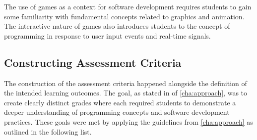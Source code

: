 






The use of games as a context for software development requires students to gain some familiarity with fundamental concepts related to graphics and animation. The interactive nature of games also introduces students to the concept of programming in response to user input events and real-time signals.

\clearpage
\subsection{Constructing Assessment Criteria} %
\label{sub:intro_constructing_assessment_criteria}

The construction of the assessment criteria happened alongside the definition of the intended learning outcomes. The goal, as stated in  of \cref{cha:approach}, was to create clearly distinct grades where each required students to demonstrate a deeper understanding of programming concepts and software development practices. These goals were met by applying the guidelines from \cref{cha:approach} as outlined in the following list.

